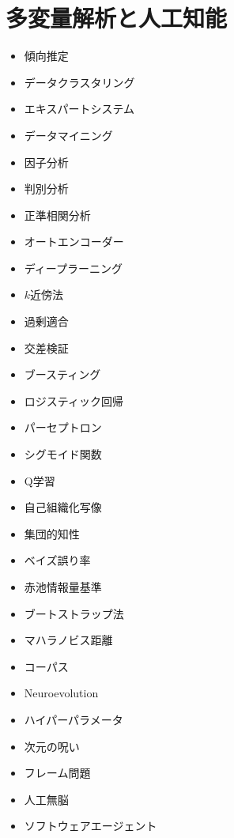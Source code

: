 \documentclass[a4j, titlepage, 11pt]{jsarticle}
\begin{document}
\section{多変量解析と人工知能}
\begin{multicols}{2}
\begin{itemize}
	\item 傾向推定
	\item データクラスタリング
	\item エキスパートシステム
	\item データマイニング
	\item 因子分析
	\item 判別分析
	\item 正準相関分析
	\item オートエンコーダー
	\item ディープラーニング
	\item $k$近傍法
	\item 過剰適合
	\item 交差検証
	\item ブースティング
	\item ロジスティック回帰
	\item パーセプトロン
	\item シグモイド関数
	\item Q学習
	\item 自己組織化写像
	\item 集団的知性
	\item ベイズ誤り率
	\item 赤池情報量基準
	\item ブートストラップ法
	\item マハラノビス距離
	\item コーパス
	\item Neuroevolution
	\item ハイパーパラメータ
	\item 次元の呪い
	\item フレーム問題
	\item 人工無脳
	\item ソフトウェアエージェント
\end{itemize}
\end{multicols}

\clearpage
\end{document}
